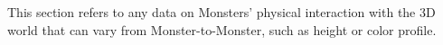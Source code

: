 
This section refers to any data on Monsters' physical interaction with the 3D world that can vary from Monster-to-Monster, such as height or color profile.